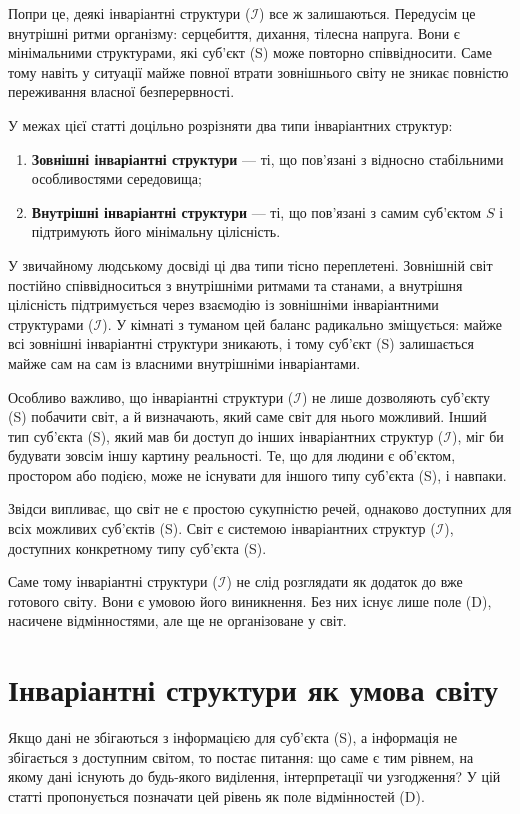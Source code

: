 \documentclass[aps,prd,onecolumn,nofootinbib,superscriptaddress]{revtex4-2}
\begin{document}
Попри це, деякі інваріантні структури ($\mathcal{I}$) все ж залишаються. Передусім це внутрішні ритми організму: серцебиття, дихання, тілесна напруга. Вони є мінімальними структурами, які суб’єкт (S) може повторно співвідносити. Саме тому навіть у ситуації майже повної втрати зовнішнього світу не зникає повністю переживання власної безперервності.

У межах цієї статті доцільно розрізняти два типи інваріантних структур:

\begin{enumerate}
    \item \textbf{Зовнішні інваріантні структури} --- ті, що пов’язані з відносно стабільними особливостями середовища;

    \item \textbf{Внутрішні інваріантні структури} --- ті, що пов’язані з самим суб’єктом \(S\) і підтримують його мінімальну цілісність.
\end{enumerate}

У звичайному людському досвіді ці два типи тісно переплетені. Зовнішній світ постійно співвідноситься з внутрішніми ритмами та станами, а внутрішня цілісність підтримується через взаємодію із зовнішніми інваріантними структурами ($\mathcal{I}$). У кімнаті з туманом цей баланс радикально зміщується: майже всі зовнішні інваріантні структури зникають, і тому суб’єкт (S) залишається майже сам на сам із власними внутрішніми інваріантами.

Особливо важливо, що інваріантні структури ($\mathcal{I}$) не лише дозволяють суб’єкту (S) побачити світ, а й визначають, який саме світ для нього можливий. Інший тип суб’єкта (S), який мав би доступ до інших інваріантних структур ($\mathcal{I}$), міг би будувати зовсім іншу картину реальності. Те, що для людини є об’єктом, простором або подією, може не існувати для іншого типу суб’єкта (S), і навпаки.

Звідси випливає, що світ не є простою сукупністю речей, однаково доступних для всіх можливих суб’єктів (S). Світ є системою інваріантних структур ($\mathcal{I}$), доступних конкретному типу суб’єкта (S).

Саме тому інваріантні структури ($\mathcal{I}$) не слід розглядати як додаток до вже готового світу. Вони є умовою його виникнення. Без них існує лише поле (D), насичене відмінностями, але ще не організоване у світ.

\section{Інваріантні структури як умова світу}
Якщо дані не збігаються з інформацією для суб’єкта (S), а інформація не збігається з доступним світом, то постає питання: що саме є тим рівнем, на якому дані існують до будь-якого виділення, інтерпретації чи узгодження? У цій статті пропонується позначати цей рівень як поле відмінностей (D).
\end{document}
